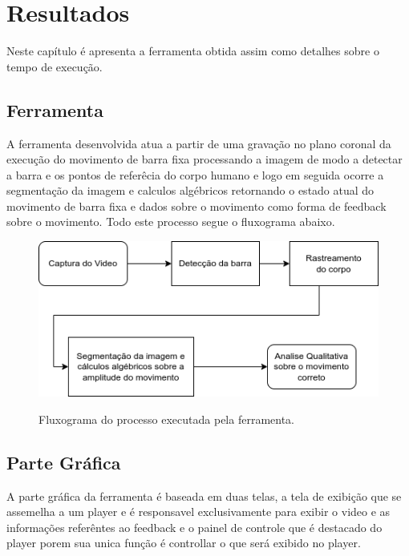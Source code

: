 \chapter{Resultados}

Neste capítulo é apresenta a ferramenta obtida assim como detalhes sobre o tempo de execução.



\section[Ferramenta]{Ferramenta}

A ferramenta desenvolvida atua a partir de uma gravação no plano coronal da execução do movimento de barra fixa processando a imagem de modo a detectar a barra e os pontos de referêcia do corpo humano e logo em seguida ocorre a segmentação da imagem e calculos algébricos retornando o estado atual do movimento de barra fixa e dados sobre o movimento como forma de feedback sobre o movimento. Todo este processo segue o fluxograma abaixo.

\begin{figure}[!htb]
	\centering
  \caption{Fluxograma do processo executada pela ferramenta.}
	\includegraphics[scale=0.7]{figuras/diagrama/processo.png}
	\label{fig:fluxo}
\end{figure}


\section[Parte Gráfica]{Parte Gráfica}

A parte gráfica da ferramenta é baseada em duas telas, a tela de exibição que se assemelha a um player e é responsavel exclusivamente para exibir o video e as informações referêntes ao feedback e o painel de controle que é destacado do player porem sua unica função é controllar o que será exibido no player.


